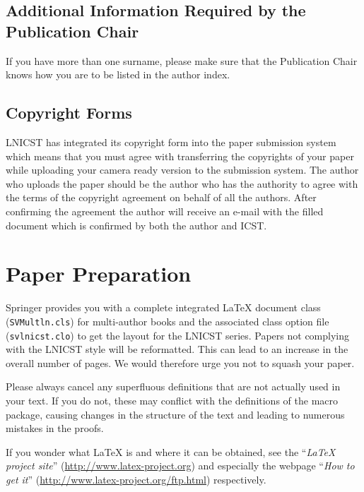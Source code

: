 \documentclass[lnicst,sechang,a4paper]{svmultln}
\begin{document}
\subsection{Additional Information Required by the Publication Chair}

If you have more than one surname, please make sure that the Publication Chair
knows how you are to be listed in the author index.

\subsection{Copyright Forms}

LNICST has integrated its copyright form into the paper submission system
which means that you must agree with transferring the copyrights of your
paper while uploading your camera ready version to the submission system.
The author who uploads the paper should be the author who has the authority
to agree with the terms of the copyright agreement on behalf of all the
authors. After confirming the agreement the author will receive an e-mail
with the filled document which is confirmed by both the author and ICST.

\section{Paper Preparation}

Springer
provides you with a complete integrated \LaTeX{} document class (\texttt{SVMultln.cls})
for multi-author books and the associated class option file (\texttt{svlnicst.clo})
to get the layout for the LNICST series.
Papers not complying with the LNICST style will be reformatted. This can
lead to an increase in the overall number of pages. We would therefore
urge you not to squash your paper.

Please always cancel any superfluous definitions that are
not actually used in your text. If you do not, these may conflict with
the definitions of the macro package, causing changes in the structure
of the text and leading to numerous mistakes in the proofs.

If you wonder what \LaTeX{} is and where it can be obtained, see the
``\textit{LaTeX project site}'' (\url{http://www.latex-project.org})
and especially the webpage ``\textit{How to get it}''
(\url{http://www.latex-project.org/ftp.html}) respectively.
\end{document}
